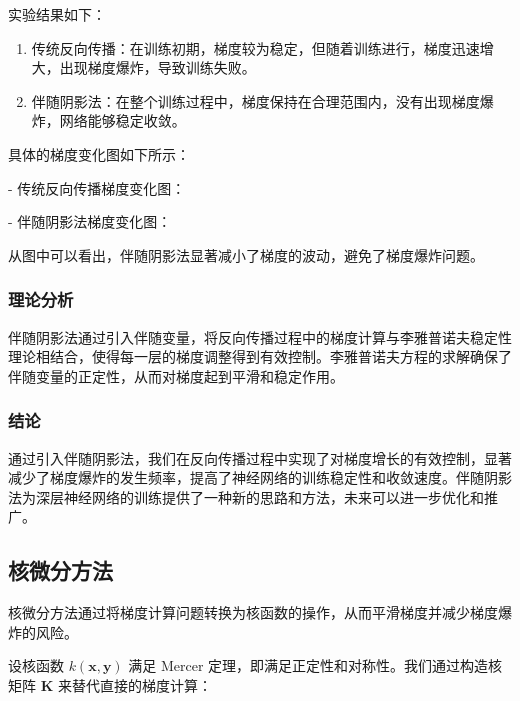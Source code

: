 \documentclass[12pt,a4paper]{amsart}
\begin{document}
实验结果如下：

\begin{enumerate}

  \item 传统反向传播：在训练初期，梯度较为稳定，但随着训练进行，梯度迅速增大，出现梯度爆炸，导致训练失败。
   
  \item 伴随阴影法：在整个训练过程中，梯度保持在合理范围内，没有出现梯度爆炸，网络能够稳定收敛。

\end{enumerate}

具体的梯度变化图如下所示：

- 传统反向传播梯度变化图：


- 伴随阴影法梯度变化图：


从图中可以看出，伴随阴影法显著减小了梯度的波动，避免了梯度爆炸问题。

\subsubsection{理论分析}

伴随阴影法通过引入伴随变量，将反向传播过程中的梯度计算与李雅普诺夫稳定性理论相结合，使得每一层的梯度调整得到有效控制。李雅普诺夫方程的求解确保了伴随变量的正定性，从而对梯度起到平滑和稳定作用。

\subsubsection{结论}

通过引入伴随阴影法，我们在反向传播过程中实现了对梯度增长的有效控制，显著减少了梯度爆炸的发生频率，提高了神经网络的训练稳定性和收敛速度。伴随阴影法为深层神经网络的训练提供了一种新的思路和方法，未来可以进一步优化和推广。

\subsection{核微分方法}

核微分方法通过将梯度计算问题转换为核函数的操作，从而平滑梯度并减少梯度爆炸的风险。

设核函数 \(k(\mathbf{x}, \mathbf{y})\) 满足 Mercer 定理，即满足正定性和对称性。我们通过构造核矩阵 \(\mathbf{K}\) 来替代直接的梯度计算：
\end{document}
